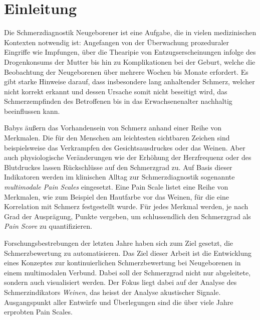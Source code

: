 \chapter{Einleitung}

Die Schmerzdiagnostik Neugeborener ist eine Aufgabe, die in vielen medizinischen Kontexten notwendig ist: Angefangen von der Überwachung prozeduraler Eingriffe wie Impfungen, über die Thearipie von Entzugserscheinungen infolge des Drogenkonsums der Mutter bis hin zu Komplikationen bei der Geburt, welche die Beobachtung der Neugeborenen über mehrere Wochen bis Monate erfordert. Es gibt starke Hinweise darauf, dass insbesondere lang anhaltender Schmerz, welcher nicht korrekt erkannt und dessen Ursache somit nicht beseitigt wird, das Schmerzempfinden des Betroffenen bis in das Erwachsenenalter nachhaltig beeinflussen kann.\cite[S. 402]{PainAssessment03}

Babys äußern das Vorhandensein von Schmerz anhand einer Reihe von Merkmalen. Die für den Menschen am leichtesten sichtbaren Zeichen sind beispielsweise das Verkrampfen des Gesichtsausdruckes oder das Weinen. Aber auch physiologische Veränderungen wie der Erhöhung der Herzfrequenz oder des Blutdruckes lassen Rückschlüsse auf den Schmerzgrad zu.\cite[S. 440]{PainAssessment01} Auf Basis dieser Indikatoren werden im klinischen Alltag zur Schmerzdiagnostik sogenannte \emph{multimodale Pain Scales} eingesetzt. Eine Pain Scale listet eine Reihe von Merkmalen, wie zum Beispiel den Hautfarbe vor das Weinen, für die eine Korrelation mit Schmerz festgestellt wurde. Für jedes Merkmal werden, je nach Grad der Ausprägung, Punkte vergeben, um schlussendlich den Schmerzgrad als \emph{Pain Score} zu quantifizieren.\cite[S. 406]{PainAssessment03}

Forschungsbestrebungen der letzten Jahre haben sich zum Ziel gesetzt, die Schmerzbewertung zu automatisieren. Das Ziel dieser Arbeit ist die Entwicklung eines Konzeptes zur kontinuierlichen Schmerzbewertung bei Neugeborenen in einem multimodalen Verbund. Dabei soll der Schmerzgrad nicht nur abgeleitete, sondern auch visualisiert werden. Der Fokus liegt dabei auf der Analyse des Schmerzindikators \emph{Weinen}, das heisst der Analyse akustischer Signale. Ausgangspunkt aller Entwürfe und Überlegungen sind die über viele Jahre erprobten Pain Scales.

